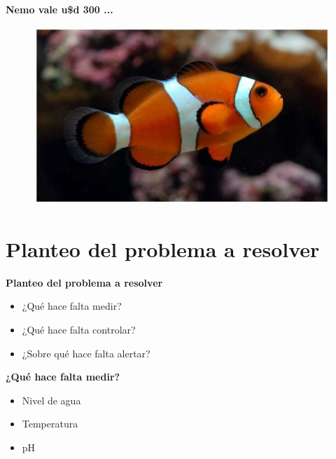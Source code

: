 \documentclass[11pt]{beamer}
\begin{document}
\begin{frame}{\LARGE{\textbf{Nemo vale u\$d 300 ...}}}
	\begin{figure}[H]
		{\includegraphics[width=1\textwidth]{./imagenes/nemo.jpg}}
	\end{figure}	  	  	
\end{frame}


\section[Problema]{Planteo del problema a resolver}

\begin{frame}{\textbf{\LARGE{Planteo del problema a resolver}}}
\fontsize{18pt}{18}\selectfont
	\begin{itemize}
		\item {¿Qué hace falta medir?}
		\vspace{20px}
		\item ¿Qué hace falta controlar?
		\vspace{20px}
		\item ¿Sobre qué hace falta alertar?
		\vspace{10px}
	\end{itemize}
\end{frame}

\begin{frame}{\textbf{\LARGE{¿Qué hace falta medir?}}}
\fontsize{18pt}{18}\selectfont
\begin{minipage}[c]{1.0\linewidth}
      \centering
      \begin{itemize}
		\item Nivel de agua		
		\vspace{20px}
		\item Temperatura
		\vspace{20px}      	
      	\item pH
		\vspace{20px}
	\end{itemize}
\end{minipage}
\end{frame}
	
\end{document}

